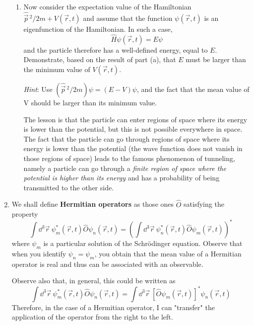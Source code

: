 \documentclass[../psets.tex]{subfiles}
\begin{document}
\begin{enumerate}
\begin{enumerate}
        \item Now consider the expectation value of the Hamiltonian $\hat{\vec{p}}{\,}^2/2m+V(\vec{r},t)$ and assume that the function $\psi(\vec{r},t)$ is an eigenfunction of the Hamiltonian. In such a case,
        \begin{equation*}
            \hat{H}\psi(\vec{r},t) = E\psi
        \end{equation*}
        and the particle therefore has a well-defined energy, equal to $E$. Demonstrate, based on the result of part (a), that $E$ must be larger than the minimum value of $V(\vec{r},t)$.\par
        \emph{Hint}: Use $(\hat{\vec{p}}{\,}^2/2m)\psi=(E-V)\psi$, and the fact that the mean value of V should be larger than its minimum value.\par
        The lesson is that the particle can enter regions of space where its energy is lower than the potential, but this is not possible everywhere in space. The fact that the particle can go through regions of space where its energy is lower than the potential (the wave function does not vanish in those regions of space) leads to the famous phenomenon of tunneling, namely a particle can go through a \emph{finite region of space where the potential is higher than its energy} and has a probability of being transmitted to the other side.
    \end{enumerate}
    \item We shall define \textbf{Hermitian operators} as those ones $\hat{O}$ satisfying the property
    \begin{equation}\label{eqn:HermitianDef}
        \int\dd^3\vec{r}\ \psi_m^*(\vec{r},t)\hat{O}\psi_n(\vec{r},t) = \left( \int\dd^3\vec{r}\ \psi_n^*(\vec{r},t)\hat{O}\psi_m(\vec{r},t) \right)^*
    \end{equation}
    where $\psi_m$ is a particular solution of the Schr\"{o}dinger equation. Observe that when you identify $\psi_n=\psi_m$, you obtain that the mean value of a Hermitian operator is real and thus can be associated with an observable.\par
    Observe also that, in general, this could be written as
    \begin{equation*}
        \int\dd^3\vec{r}\ \psi_m^*(\vec{r},t)\hat{O}\psi_n(\vec{r},t) = \int\dd^3\vec{r}\ [\hat{O}\psi_m(\vec{r},t)]^*\psi_n(\vec{r},t)
    \end{equation*}
    Therefore, in the case of a Hermitian operator, I can "transfer" the application of the operator from the right to the left.

\end{enumerate}
\end{document}
